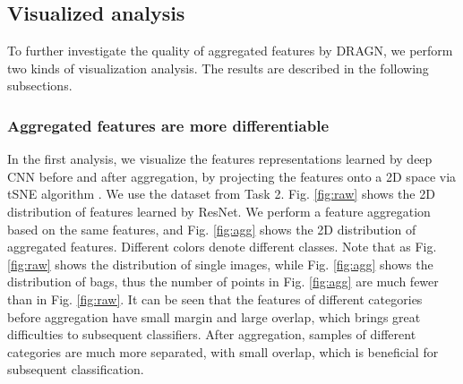 \documentclass[10pt,twocolumn,letterpaper]{article}
\begin{document}
\subsection{Visualized analysis}
To further investigate the quality of aggregated features by DRAGN, we perform two kinds of visualization analysis. The results are described in the following subsections.

\subsubsection{Aggregated features are more differentiable}\label{sec:vis1}
In the first analysis, we visualize the features representations learned by deep CNN before and after aggregation, by projecting the features onto a 2D space via tSNE algorithm \cite{tsne}. We use the dataset from Task 2. Fig. \ref{fig:raw} shows the 2D distribution of features learned by ResNet. We perform a feature aggregation based on the same features, and Fig. \ref{fig:agg} shows the 2D distribution of aggregated features. Different colors denote different classes. Note that as Fig. \ref{fig:raw} shows the distribution of single images, while Fig. \ref{fig:agg} shows the distribution of bags, thus the number of points in Fig. \ref{fig:agg} are much fewer than in Fig. \ref{fig:raw}. It can be seen that the features of different categories before aggregation have small margin and large overlap, which brings great difficulties to subsequent classifiers. After aggregation, samples of different categories are much more separated, with small overlap, which is beneficial for subsequent classification.
\end{document}
